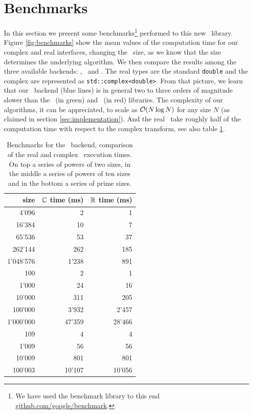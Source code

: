 \section{Benchmarks}
In this section we present some benchmarks\footnote{We have used the benchmark
library to this end \url{github.com/google/benchmark}.} 
performed to this new \boostfft\
library. Figure \ref{fig:benchmarks} show the mean values of the computation
time for our complex and real interfaces,
changing the \dft\ size, as we know that the size determines the underlying algorithm.
We then compare the results among the three available backends: \bsl, \gsl\ and \fftw.
The real types are the standard \verb|double| and the complex are represented as 
\verb|std::complex<double>|.
From that picture, we learn that our \bsl\ backend (blue lines) is in general two to three
orders of magnitude slower than the \gsl\ (in green) and \fftw\ (in red) libraries. 
The complexity of our algorithms, it can be appreciated, to scale as 
$\mathcal{O}(N \log N)$ for any size $N$ (as claimed in section
\ref{sec:implementation}). And the real \dft\ take roughly half of the
computation time with respect to the complex transform, see also table
\ref{tab:benchmarks}.
\begin{table}
    \centering
    \begin{tabular}{rrr}
        \dft\ size & $\mathbb{C}$ time (ms) & $\mathbb{R}$ time (ms) \\
        \hline
4'096    &     2 &   1 \\
16'384   &    10 &   7 \\
65'536   &    53 &  37 \\
262'144  &   262 & 185 \\
1'048'576 &  1'238 & 891 \\
        \hline
100    & 2     & 1 \\
1'000   & 24    & 16 \\
10'000  & 311   & 205 \\
100'000 & 3'932  & 2'457 \\
1'000'000& 47'359 & 28'466 \\
        \hline
109     &    4  &    4  \\
1'009   &    56  &   56  \\
10'009  &   801  &  801  \\
100'003 &  10'107 &10'056  \\
    \end{tabular}
    \caption{Benchmarks for the \bsl\ backend, comparison of the real and
    complex \dft\ execution times. On top a series of powers of two sizes, in
    the middle a series of powers of ten sizes and in the bottom a series of
    prime sizes.}
    \label{tab:benchmarks}
\end{table}
